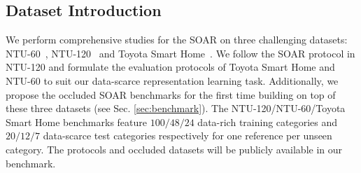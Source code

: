 \documentclass[lettersize,journal]{IEEEtran}
\begin{document}
\subsection{Dataset Introduction}
We perform comprehensive studies for the SOAR on three challenging datasets: NTU-60~\cite{shahroudy2016ntu}, NTU-120~\cite{liu2019ntu} and Toyota Smart Home~\cite{Das_2019_ICCV}.
We follow the SOAR protocol in NTU-120 and formulate the evaluation protocols of Toyota Smart Home and NTU-60 to suit our data-scarce representation learning task. Additionally, we propose the occluded SOAR benchmarks for the first time building on top of these three datasets (see Sec. \ref{sec:benchmark}). The NTU-120/NTU-60/Toyota Smart Home benchmarks feature $100/48/24$ data-rich training categories and $20/12/7$ data-scarce test categories respectively for one reference per unseen category. The protocols and occluded datasets will be publicly available in our benchmark.
\end{document}
